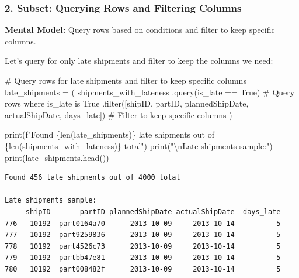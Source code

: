 \documentclass[
]{article}
\newenvironment{Shaded}{\begin{snugshade}}{\end{snugshade}}
\newcommand{\BuiltInTok}[1]{\textcolor[rgb]{0.00,0.23,0.31}{#1}}
\newcommand{\CharTok}[1]{\textcolor[rgb]{0.13,0.47,0.30}{#1}}
\newcommand{\CommentTok}[1]{\textcolor[rgb]{0.37,0.37,0.37}{#1}}
\newcommand{\NormalTok}[1]{\textcolor[rgb]{0.00,0.23,0.31}{#1}}
\newcommand{\OperatorTok}[1]{\textcolor[rgb]{0.37,0.37,0.37}{#1}}
\newcommand{\SpecialCharTok}[1]{\textcolor[rgb]{0.37,0.37,0.37}{#1}}
\newcommand{\SpecialStringTok}[1]{\textcolor[rgb]{0.13,0.47,0.30}{#1}}
\newcommand{\StringTok}[1]{\textcolor[rgb]{0.13,0.47,0.30}{#1}}
\begin{document}
\subsubsection{2. Subset: Querying Rows and Filtering
Columns}\label{subset-querying-rows-and-filtering-columns}

\textbf{Mental Model:} Query rows based on conditions and filter to keep
specific columns.

Let's query for only late shipments and filter to keep the columns we
need:

\label{mental-model-2-subset}
\begin{Shaded}
\begin{Highlighting}[]
\CommentTok{\# Query rows for late shipments and filter to keep specific columns}
\NormalTok{late\_shipments }\OperatorTok{=}\NormalTok{ (}
\NormalTok{    shipments\_with\_lateness}
\NormalTok{    .query(}\StringTok{\textquotesingle{}is\_late == True\textquotesingle{}}\NormalTok{)  }\CommentTok{\# Query rows where is\_late is True}
\NormalTok{    .}\BuiltInTok{filter}\NormalTok{([}\StringTok{\textquotesingle{}shipID\textquotesingle{}}\NormalTok{, }\StringTok{\textquotesingle{}partID\textquotesingle{}}\NormalTok{, }\StringTok{\textquotesingle{}plannedShipDate\textquotesingle{}}\NormalTok{, }\StringTok{\textquotesingle{}actualShipDate\textquotesingle{}}\NormalTok{, }\StringTok{\textquotesingle{}days\_late\textquotesingle{}}\NormalTok{])  }\CommentTok{\# Filter to keep specific columns}
\NormalTok{)}

\BuiltInTok{print}\NormalTok{(}\SpecialStringTok{f"Found }\SpecialCharTok{\{}\BuiltInTok{len}\NormalTok{(late\_shipments)}\SpecialCharTok{\}}\SpecialStringTok{ late shipments out of }\SpecialCharTok{\{}\BuiltInTok{len}\NormalTok{(shipments\_with\_lateness)}\SpecialCharTok{\}}\SpecialStringTok{ total"}\NormalTok{)}
\BuiltInTok{print}\NormalTok{(}\StringTok{"}\CharTok{\textbackslash{}n}\StringTok{Late shipments sample:"}\NormalTok{)}
\BuiltInTok{print}\NormalTok{(late\_shipments.head())}
\end{Highlighting}
\end{Shaded}

\begin{verbatim}
Found 456 late shipments out of 4000 total

Late shipments sample:
     shipID       partID plannedShipDate actualShipDate  days_late
776   10192  part0164a70      2013-10-09     2013-10-14          5
777   10192  part9259836      2013-10-09     2013-10-14          5
778   10192  part4526c73      2013-10-09     2013-10-14          5
779   10192  partbb47e81      2013-10-09     2013-10-14          5
780   10192  part008482f      2013-10-09     2013-10-14          5
\end{verbatim}
\end{document}
